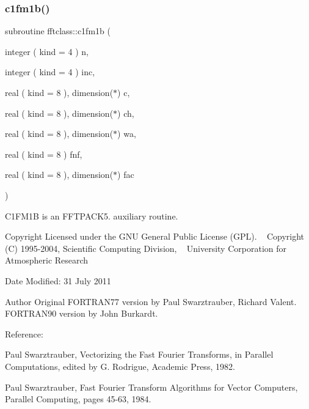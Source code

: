 \subsubsection{\texorpdfstring{c1fm1b()}{c1fm1b()}}
{\footnotesize\ttfamily subroutine fftclass\+::c1fm1b (\begin{DoxyParamCaption}\item[{integer ( kind = 4 )}]{n,  }\item[{integer ( kind = 4 )}]{inc,  }\item[{real ( kind = 8 ), dimension($\ast$)}]{c,  }\item[{real ( kind = 8 ), dimension($\ast$)}]{ch,  }\item[{real ( kind = 8 ), dimension($\ast$)}]{wa,  }\item[{real ( kind = 8 )}]{fnf,  }\item[{real ( kind = 8 ), dimension($\ast$)}]{fac }\end{DoxyParamCaption})}



C1\+F\+M1B is an F\+F\+T\+P\+A\+C\+K5. auxiliary routine. 

\begin{DoxyCopyright}{Copyright}
Licensed under the G\+NU General Public License (G\+PL). ~\newline
 Copyright (C) 1995-\/2004, Scientific Computing Division, ~\newline
 University Corporation for Atmospheric Research 
\end{DoxyCopyright}
\begin{DoxyDate}{Date}
Modified\+: 31 July 2011 
\end{DoxyDate}
\begin{DoxyAuthor}{Author}
Original F\+O\+R\+T\+R\+A\+N77 version by Paul Swarztrauber, Richard Valent. ~\newline
 F\+O\+R\+T\+R\+A\+N90 version by John Burkardt.
\end{DoxyAuthor}
\begin{DoxyVerb}  Reference:

    Paul Swarztrauber,
    Vectorizing the Fast Fourier Transforms,
    in Parallel Computations,
    edited by G. Rodrigue,
    Academic Press, 1982.

    Paul Swarztrauber,
    Fast Fourier Transform Algorithms for Vector Computers,
    Parallel Computing, pages 45-63, 1984.\end{DoxyVerb}
 
